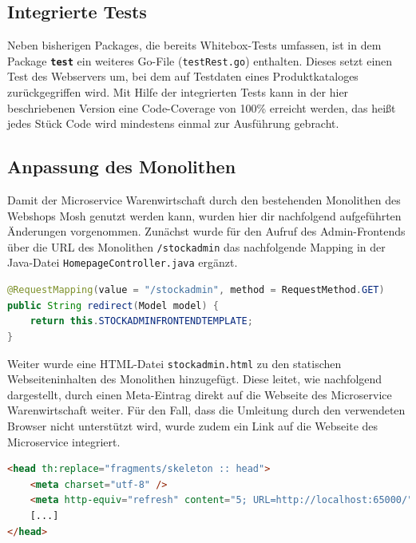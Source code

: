 \subsection{Integrierte Tests}
\label{subsec: Integrierte Test}
Neben bisherigen Packages, die bereits Whitebox-Tests umfassen, ist in dem Package \textbf{\texttt{test}} ein weiteres Go-File (\texttt{testRest.go}) enthalten. Dieses setzt einen Test des Webservers um, bei dem auf Testdaten eines Produktkataloges zurückgegriffen wird. Mit Hilfe der integrierten Tests kann in der hier beschriebenen Version eine Code-Coverage von 100\% erreicht werden, das heißt jedes Stück Code wird mindestens einmal zur Ausführung gebracht.

\newpage
\subsection{Anpassung des Monolithen}
\label{subsec: Anpassung des Monolithen}
Damit der Microservice Warenwirtschaft durch den bestehenden Monolithen des Webshops Mosh genutzt werden kann, wurden hier dir nachfolgend aufgeführten Änderungen vorgenommen. Zunächst wurde für den Aufruf des Admin-Frontends über die URL des Monolithen \texttt{/stockadmin} das nachfolgende Mapping in der Java-Datei \texttt{HomepageController.java} ergänzt.

\begin{lstlisting}[caption=Datenabfrage von der Bestellung (Waren wurden bestellt), language=Java]
@RequestMapping(value = "/stockadmin", method = RequestMethod.GET)
public String redirect(Model model) {
	return this.STOCKADMINFRONTENDTEMPLATE;
}
\end{lstlisting}

Weiter wurde eine HTML-Datei \texttt{stockadmin.html} zu den statischen Webseiteninhalten des Monolithen hinzugefügt. Diese leitet, wie nachfolgend dargestellt, durch einen Meta-Eintrag direkt auf die Webseite des Microservice Warenwirtschaft weiter. Für den Fall, dass die Umleitung durch den verwendeten Browser nicht unterstützt wird, wurde zudem ein Link auf die Webseite des Microservice integriert.

\begin{lstlisting}[caption=Datenabfrage von der Bestellung (Waren wurden bestellt), language=HTML]
<head th:replace="fragments/skeleton :: head">
	<meta charset="utf-8" />
    <meta http-equiv="refresh" content="5; URL=http://localhost:65000/"/>
    [...]
</head>
\end{lstlisting}
